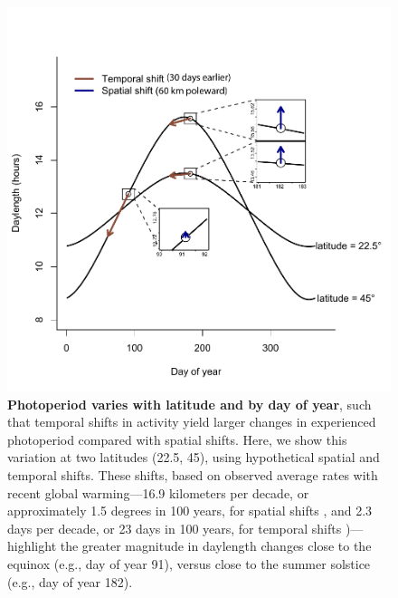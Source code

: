 \documentclass{article}
\begin{document}
\begin{figure}[p]
\centering
\includegraphics{..//..//analyses/photoperiod/figures/photo_spacetime_v2.pdf} %
\caption{\textbf{Photoperiod varies with latitude and by day of year}, such that temporal shifts in activity yield larger changes in experienced photoperiod compared with spatial shifts. Here, we show this variation at two latitudes (22.5\degree, 45\degree), using hypothetical spatial and temporal shifts. These shifts, based on observed average rates with recent global warming---16.9 kilometers per decade, or approximately 1.5 degrees in 100 years, for spatial shifts \citep{parmesan2006}, and 2.3 days per decade, or 23 days in 100 years, for temporal shifts \citep{chen2011})---highlight the greater magnitude in daylength changes close to the equinox (e.g., day of year 91), versus close to the summer solstice (e.g., day of year 182).}
 \label{fig:spacetime}%
 \end{figure}
 
\end{document}
